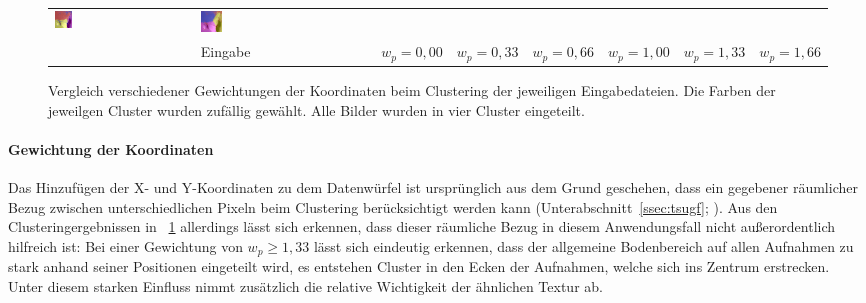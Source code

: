 \begin{figure}[h!]
\begin{tabular}{m{15pt}m{}m{}m{}m{}m{}m{}m{}}
		\includegraphics[width=0.13\textwidth]{images/gen/spatial_weight/p03_04.png_1.33.png} &
		\includegraphics[width=0.13\textwidth]{images/gen/spatial_weight/p03_04.png_1.66.png} \\
		
		&
		\vspace*{2pt}\centering Eingabe & 
		\vspace*{2pt}\centering $w_p=0,00$ &
		\vspace*{2pt}\centering $w_p=0,33$ &
		\vspace*{2pt}\centering $w_p=0,66$ &
		\vspace*{2pt}\centering $w_p=1,00$ &
		\vspace*{2pt}\centering $w_p=1,33$ &
		\vspace*{2pt}\centering $w_p=1,66$
	\end{tabular}
	\caption{Vergleich verschiedener Gewichtungen der Koordinaten beim Clustering der jeweiligen Eingabedateien. Die Farben der jeweilgen Cluster wurden zufällig gewählt. Alle Bilder wurden in vier Cluster eingeteilt.}
	\label{fig:filterbank_weights_pos}
\end{figure}

\paragraph{Gewichtung der Koordinaten}
Das Hinzufügen der X- und Y-Koordinaten zu dem Datenwürfel ist ursprünglich aus dem Grund geschehen, dass ein gegebener räumlicher Bezug zwischen unterschiedlichen Pixeln beim Clustering berücksichtigt werden kann (\vgl Unterabschnitt~\ref{ssec:tsugf}; \cite{jain_91}). Aus den Clusteringergebnissen in \figurename~\ref{fig:filterbank_weights_pos} allerdings lässt sich erkennen, dass dieser räumliche Bezug in diesem Anwendungsfall nicht außerordentlich hilfreich ist: Bei einer Gewichtung von $w_p\geq1,33$ lässt sich eindeutig erkennen, dass der allgemeine Bodenbereich auf allen Aufnahmen zu stark anhand seiner Positionen eingeteilt wird, es entstehen Cluster in den Ecken der Aufnahmen, welche sich ins Zentrum erstrecken. Unter diesem starken Einfluss nimmt zusätzlich die relative Wichtigkeit der ähnlichen Textur ab.

